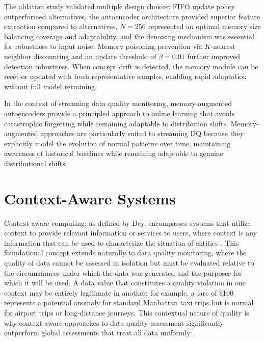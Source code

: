The ablation study validated multiple design choices: FIFO update policy outperformed alternatives, the autoencoder architecture provided superior feature extraction compared to alternatives, $N=256$ represented an optimal memory size balancing coverage and adaptability, and the denoising mechanism was essential for robustness to input noise. Memory poisoning prevention via $K$-nearest neighbor discounting and an update threshold of $\beta=0.01$ further improved detection robustness. When concept drift is detected, the memory module can be reset or updated with fresh representative samples, enabling rapid adaptation without full model retraining.

In the context of streaming data quality monitoring, memory-augmented autoencoders provide a principled approach to online learning that avoids catastrophic forgetting while remaining adaptable to distribution shifts. Memory-augmented approaches are particularly suited to streaming DQ because they explicitly model the evolution of normal patterns over time, maintaining awareness of historical baselines while remaining adaptable to genuine distributional shifts.

\section{Context-Aware Systems}

Context-aware computing, as defined by Dey, encompasses systems that utilize context to provide relevant information or services to users, where context is any information that can be used to characterize the situation of entities \citep{dey2001understanding}. This foundational concept extends naturally to data quality monitoring, where the quality of data cannot be assessed in isolation but must be evaluated relative to the circumstances under which the data was generated and the purposes for which it will be used. A data value that constitutes a quality violation in one context may be entirely legitimate in another: for example, a fare of \$100 represents a potential anomaly for standard Manhattan taxi trips but is normal for airport trips or long-distance journeys. This contextual nature of quality is why context-aware approaches to data quality assessment significantly outperform global assessments that treat all data uniformly \citep{contextdq2022}.

